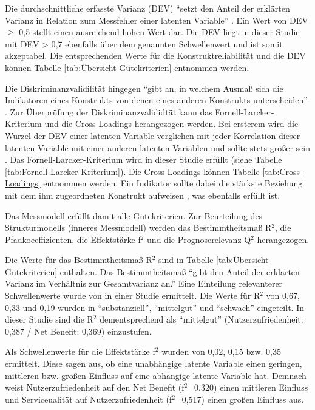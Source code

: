 Die durchschnittliche erfasste Varianz (DEV) "`setzt den Anteil der erklärten Varianz in Relation zum Messfehler einer latenten Variable"'  \parencite[S.25]{nitzl2010anwenderorientierte}. Ein Wert von DEV $\geq$ 0,5 stellt einen ausreichend hohen Wert dar. Die DEV liegt in dieser Studie mit DEV > 0,7 ebenfalls über dem genannten Schwellenwert und ist somit akzeptabel. Die entsprechenden Werte für die Konstruktreliabilität und die DEV können Tabelle \ref{tab:Übersicht Gütekriterien} entnommen werden. 

Die Diskriminanzvalidilität hingegen "`gibt an, in welchem Ausmaß sich die Indikatoren eines Konstrukts von denen eines anderen Konstrukts unterscheiden"' \parencite[S.26]{nitzl2010anwenderorientierte}. Zur Überprüfung der Diskriminanzvalididtät kann das Fornell-Larcker-Kriterium und die Cross Loadings herangezogen werden. 
Bei ersterem wird die Wurzel der DEV einer latenten Variable verglichen mit jeder Korrelation dieser latenten Variable mit einer anderen latenten Variablen und sollte stets größer sein \parencite[vgl.][S.26]{nitzl2010anwenderorientierte}. Das Fornell-Larcker-Kriterium wird in dieser Studie erfüllt (siehe Tabelle \ref{tab:Fornell-Larcker-Kriterium}). Die Cross Loadings können Tabelle \ref{tab:Cross-Loadings} entnommen werden. Ein Indikator sollte dabei die stärkste Beziehung mit dem ihm zugeordneten Konstrukt aufweisen \parencite[vgl.][S.26]{nitzl2010anwenderorientierte}, was ebenfalls erfüllt ist.   \nocite{fornell1981evaluating}

Das Messmodell erfüllt damit alle Gütekriterien. Zur Beurteilung des Strukturmodells (inneres Messmodell) werden das Bestimmtheitsmaß R$^2$, die Pfadkoeeffizienten, die Effektstärke f$^2$ und die Prognoserelevanz Q$^2$ herangezogen.  

Die Werte für das Bestimmtheitsmaß R$^2$ sind in Tabelle \ref{tab:Übersicht Gütekriterien} enthalten. Das Bestimmtheitsmaß "`gibt den Anteil der erklärten Varianz im Verhältnis zur Gesamtvarianz an."' \parencite[S.32]{nitzl2010anwenderorientierte} Eine Einteilung relevanterer Schwellenwerte wurde von \textcite[S.323]{chin1998partial} in einer Studie ermittelt. Die Werte für R$^2$ von 0,67, 0,33 und 0,19 wurden in "`substanziell"', "`mittelgut"' und "`schwach"' eingeteilt. In dieser Studie sind die R$^2$ dementsprechend als "`mittelgut"' (Nutzerzufriedenheit: 0,387 / Net Benefit: 0,369) einzustufen.

Als Schwellenwerte für die Effektstärke f$^2$ wurden von \textcite[S.316f.]{chin1998partial} 0,02, 0,15 bzw. 0,35 ermittelt. Diese sagen aus, ob eine unabhängige latente Variable einen geringen, mittleren bzw. großen Einfluss auf eine abhängige latente Variable hat. Demnach weist Nutzerzufriedenheit auf den Net Benefit (f$^2$=0,320) einen mittleren Einfluss und Serviceualität auf Nutzerzufriedenheit (f$^2$=0,517) einen großen Einfluss aus. 

